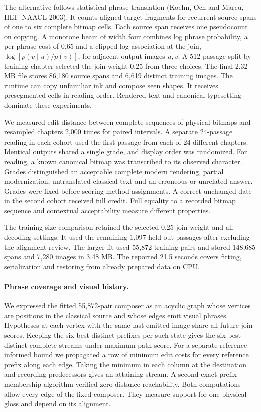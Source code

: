 \documentclass[12pt,a4paper]{article}
\providecommand{\DIFadd}[1]{{\protect\color{blue} \sf #1}} %
\begin{document}
\DIFadd{The alternative follows statistical phrase translation \textup{(Koehn, Och and Marcu, HLT--NAACL 2003)}. It counts aligned target fragments for recurrent source spans of one to six complete bitmap cells. Each source span receives one pseudocount on copying. A monotone beam of width four combines log phrase probability, a per-phrase cost of 0.65 and a clipped log association at the join, $\log[p(v\mid u)/p(v)]$, for adjacent output images $u,v$. A 512-passage split by training chapter selected the join weight 0.25 from three choices. The final 2.32-MB file stores 86,180 source spans and 6,619 distinct training images. The runtime can copy unfamiliar ink and compose seen shapes. It receives presegmented cells in reading order. Rendered text and canonical typesetting dominate these experiments.
}

\DIFadd{We measured edit distance between complete sequences of physical bitmaps and resampled chapters 2,000 times for paired intervals. A separate 24-passage reading in each cohort used the first passage from each of 24 different chapters. Identical outputs shared a single grade, and display order was randomized. For reading, a known canonical bitmap was transcribed to its observed character. Grades distinguished an acceptable complete modern rendering, partial modernization, untranslated classical text and an erroneous or unrelated answer. Grades were fixed before scoring method assignments. A correct unchanged date in the second cohort received full credit. Full equality to a recorded bitmap sequence and contextual acceptability measure different properties.
}

\DIFadd{The training-size comparison retained the selected 0.25 join weight and all decoding settings. It used the remaining 1,097 held-out passages after excluding the alignment review. The larger fit used 55,872 training pairs and stored 148,685 spans and 7,280 images in 3.48 MB. The reported 21.5 seconds covers fitting, serialization and restoring from already prepared data on CPU.
}

\paragraph{\DIFadd{Phrase coverage and visual history.}}
\DIFadd{We expressed the fitted 55,872-pair composer as an acyclic graph whose vertices are positions in the classical source and whose edges emit visual phrases. Hypotheses at each vertex with the same last emitted image share all future join scores. Keeping the six best distinct prefixes per such state gives the six best distinct complete streams under maximum path score. For a separate reference-informed bound we propagated a row of minimum edit costs for every reference prefix along each edge. Taking the minimum in each column at the destination and recording predecessors gives an attaining stream. A second exact prefix-membership algorithm verified zero-distance reachability. Both computations allow every edge of the fixed composer. They measure support for one physical gloss and depend on its alignment.
}
\end{document}
